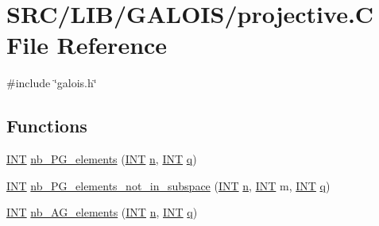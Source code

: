 \hypertarget{projective_8_c}{}\section{S\+R\+C/\+L\+I\+B/\+G\+A\+L\+O\+I\+S/projective.C File Reference}
\label{projective_8_c}
{\ttfamily \#include \char`\"{}galois.\+h\char`\"{}}\newline
\subsection*{Functions}
\begin{DoxyCompactItemize}
\item 
\mbox{\hyperlink{galois_8h_a09fddde158a3a20bd2dcadb609de11dc}{I\+NT}} \mbox{\hyperlink{projective_8_c_ada56c56cb5c7b39553dc0391f2df1cee}{nb\+\_\+\+P\+G\+\_\+elements}} (\mbox{\hyperlink{galois_8h_a09fddde158a3a20bd2dcadb609de11dc}{I\+NT}} \mbox{\hyperlink{simeon_8_c_a7f2cd26777ce0ff3fdaf8d02aacbddfb}{n}}, \mbox{\hyperlink{galois_8h_a09fddde158a3a20bd2dcadb609de11dc}{I\+NT}} \mbox{\hyperlink{simeon_8_c_a92cbb483a3b27ae1a0dbfcb125ce216f}{q}})
\item 
\mbox{\hyperlink{galois_8h_a09fddde158a3a20bd2dcadb609de11dc}{I\+NT}} \mbox{\hyperlink{projective_8_c_a3d91cd5837ab4c11dce288f616fb8a9b}{nb\+\_\+\+P\+G\+\_\+elements\+\_\+not\+\_\+in\+\_\+subspace}} (\mbox{\hyperlink{galois_8h_a09fddde158a3a20bd2dcadb609de11dc}{I\+NT}} \mbox{\hyperlink{simeon_8_c_a7f2cd26777ce0ff3fdaf8d02aacbddfb}{n}}, \mbox{\hyperlink{galois_8h_a09fddde158a3a20bd2dcadb609de11dc}{I\+NT}} m, \mbox{\hyperlink{galois_8h_a09fddde158a3a20bd2dcadb609de11dc}{I\+NT}} \mbox{\hyperlink{simeon_8_c_a92cbb483a3b27ae1a0dbfcb125ce216f}{q}})
\item 
\mbox{\hyperlink{galois_8h_a09fddde158a3a20bd2dcadb609de11dc}{I\+NT}} \mbox{\hyperlink{projective_8_c_ab9de2574dd403dd453a0d35107f684f5}{nb\+\_\+\+A\+G\+\_\+elements}} (\mbox{\hyperlink{galois_8h_a09fddde158a3a20bd2dcadb609de11dc}{I\+NT}} \mbox{\hyperlink{simeon_8_c_a7f2cd26777ce0ff3fdaf8d02aacbddfb}{n}}, \mbox{\hyperlink{galois_8h_a09fddde158a3a20bd2dcadb609de11dc}{I\+NT}} \mbox{\hyperlink{simeon_8_c_a92cbb483a3b27ae1a0dbfcb125ce216f}{q}})
\item 

\end{DoxyCompactItemize}
